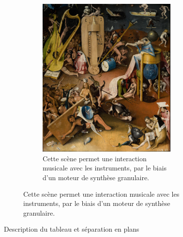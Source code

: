 \begin{landscape}
\begin{figure}
\begin{subfigure}[t]{0.3\textwidth}
\begin{subfigure}[t]{\textwidth}
            \centering
            \includegraphics[width=\textwidth]{images/C3.png}
            \caption{Cette scène permet une interaction musicale avec les instruments, par le biais d'un moteur de synthèse granulaire.}
            \label{fig.C3}
        \end{subfigure}
        \end{subfigure}
        
        \caption{Description du tableau et séparation en plans}
        \label{fig.plans}
        
    \end{figure}
    \end{landscape}
    \restoregeometry